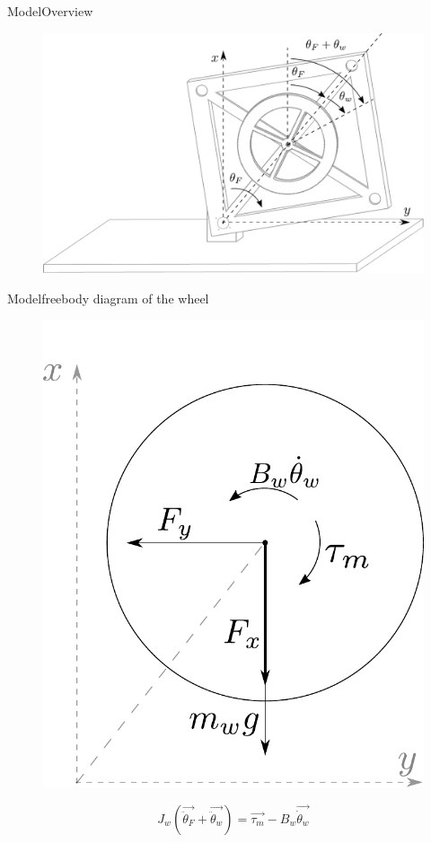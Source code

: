 \begin{frame}{Model}{Overview}
	\begin{figure}[H]
		\centering
		\includegraphics[scale=0.5]{Pictures/mechanicalSystem.pdf}
	\end{figure}
\end{frame}

\begin{frame}{Model}{freebody diagram of the wheel}
	\begin{figure}[H]
		\centering
		\includegraphics[scale=0.40]{Pictures/FreeBodyWheel.pdf}
	\end{figure}
	\begin{displaymath}	
	  \si{ J_w (\vec{\ddot{\theta}_F} + \vec{\ddot{\theta}_w}) =} 
	  \si{ \vec{\tau_m} - B_w \vec{\dot{\theta}_w }}
	\end{displaymath}
\end{frame}

